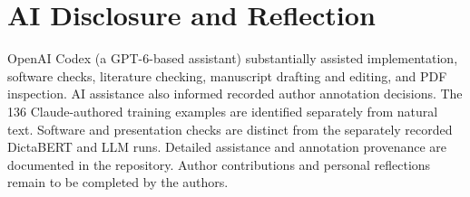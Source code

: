\documentclass[11pt]{article}
\begin{document}
\section*{AI Disclosure and Reflection}
OpenAI Codex (a GPT-6-based assistant) substantially assisted implementation, software checks, literature checking, manuscript drafting and editing, and PDF inspection. AI assistance also informed recorded author annotation decisions. The 136 Claude-authored training examples are identified separately from natural text. Software and presentation checks are distinct from the separately recorded DictaBERT and LLM runs. Detailed assistance and annotation provenance are documented in the repository. Author contributions and personal reflections remain to be completed by the authors.

\label{bodyend}

\end{document}
